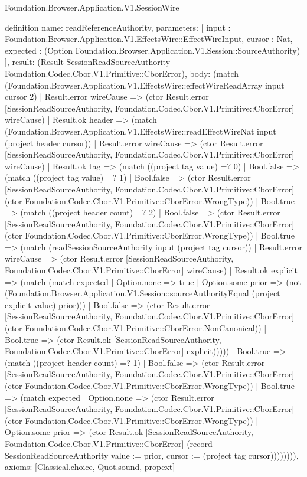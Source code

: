 \begin{lexlean}{Foundation.Browser.Application.V1.SessionWire}
\begin{semanticmodule}
definition{
  name: readReferenceAuthority,
  parameters: [
    input : Foundation.Browser.Application.V1.EffectsWire::EffectWireInput,
    cursor : Nat,
    expected : (Option Foundation.Browser.Application.V1.Session::SourceAuthority)
  ],
  result: (Result SessionReadSourceAuthority Foundation.Codec.Cbor.V1.Primitive::CborError),
  body: (match (Foundation.Browser.Application.V1.EffectsWire::effectWireReadArray input cursor 2)
    | Result.error wireCause => (ctor Result.error [SessionReadSourceAuthority, Foundation.Codec.Cbor.V1.Primitive::CborError] wireCause)
    | Result.ok header => (match (Foundation.Browser.Application.V1.EffectsWire::readEffectWireNat input (project header cursor))
      | Result.error wireCause => (ctor Result.error [SessionReadSourceAuthority, Foundation.Codec.Cbor.V1.Primitive::CborError] wireCause)
      | Result.ok tag => (match ((project tag value) =? 0)
        | Bool.false => (match ((project tag value) =? 1)
          | Bool.false => (ctor Result.error [SessionReadSourceAuthority, Foundation.Codec.Cbor.V1.Primitive::CborError] (ctor Foundation.Codec.Cbor.V1.Primitive::CborError.WrongType))
          | Bool.true => (match ((project header count) =? 2)
            | Bool.false => (ctor Result.error [SessionReadSourceAuthority, Foundation.Codec.Cbor.V1.Primitive::CborError] (ctor Foundation.Codec.Cbor.V1.Primitive::CborError.WrongType))
            | Bool.true => (match (readSessionSourceAuthority input (project tag cursor))
              | Result.error wireCause => (ctor Result.error [SessionReadSourceAuthority, Foundation.Codec.Cbor.V1.Primitive::CborError] wireCause)
              | Result.ok explicit => (match (match expected
                  | Option.none => true
                  | Option.some prior => (not (Foundation.Browser.Application.V1.Session::sourceAuthorityEqual (project explicit value) prior)))
                | Bool.false => (ctor Result.error [SessionReadSourceAuthority, Foundation.Codec.Cbor.V1.Primitive::CborError] (ctor Foundation.Codec.Cbor.V1.Primitive::CborError.NonCanonical))
                | Bool.true => (ctor Result.ok [SessionReadSourceAuthority, Foundation.Codec.Cbor.V1.Primitive::CborError] explicit)))))
        | Bool.true => (match ((project header count) =? 1)
          | Bool.false => (ctor Result.error [SessionReadSourceAuthority, Foundation.Codec.Cbor.V1.Primitive::CborError] (ctor Foundation.Codec.Cbor.V1.Primitive::CborError.WrongType))
          | Bool.true => (match expected
            | Option.none => (ctor Result.error [SessionReadSourceAuthority, Foundation.Codec.Cbor.V1.Primitive::CborError] (ctor Foundation.Codec.Cbor.V1.Primitive::CborError.WrongType))
            | Option.some prior => (ctor Result.ok [SessionReadSourceAuthority, Foundation.Codec.Cbor.V1.Primitive::CborError] (record SessionReadSourceAuthority {value := prior, cursor := (project tag cursor)}))))))),
  axioms: [Classical.choice, Quot.sound, propext]
}


\end{semanticmodule}
\end{lexlean}
